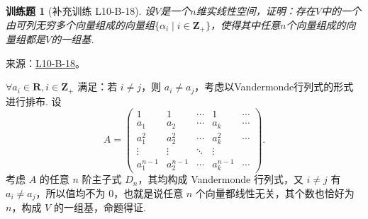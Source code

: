 \documentclass[UTF8,12pt,a4paper,fontset=fandol]{ctexart}
\newtheorem{exercise}{训练题}[section]
\begin{document}
\begin{exercise}[补充训练 L10-B-18]\label{prob:L10-B-18}
设$V$是一个$n$维实线性空间，证明：存在$V$中的一个由可列无穷多个向量组成的向量组$\{\alpha_i \mid i\in\mathbf{Z}_+\}$，使得其中任意$n$个向量组成的向量组都是$V$的一组基.
\end{exercise}
\noindent 来源：\href{https://github.com/yhwu-is/Linear-Algebra-Left-Undone/blob/new/%E8%AE%B2%E4%B9%89/%E4%B8%93%E9%A2%98/10%20%E8%A1%8C%E5%88%97%E5%BC%8F.tex}{L10-B-18}。
\begin{solve}
$\forall a_i \in \mathbf{R}, i \in \mathbf{Z}_{+}$ 满足：若 $i \neq j$，则 $a_i \neq a_j$，考虑以Vandermonde行列式的形式进行排布. 设
            \[ A = \begin{pmatrix}
                    1         & 1         & \cdots & 1         & \cdots \\
                    a_1       & a_2       & \cdots & a_k       & \cdots \\
                    a_1^2     & a_2^2     & \cdots & a_k^2     & \cdots \\
                    \vdots    & \vdots    & \ddots & \vdots    &        \\
                    a_1^{n-1} & a_2^{n-1} & \cdots & a_k^{n-1} & \cdots
                \end{pmatrix}.\]
            考虑 $A$ 的任意 $n$ 阶主子式 $D_n$，其均构成 Vandermonde 行列式，又 $i \neq j$ 有 $a_i \neq a_j$，所以值均不为 0，也就是说任意 $n$ 个向量都线性无关，其个数也恰好为 $n$，构成 $V$ 的一组基，命题得证.
\end{solve}
\end{document}
